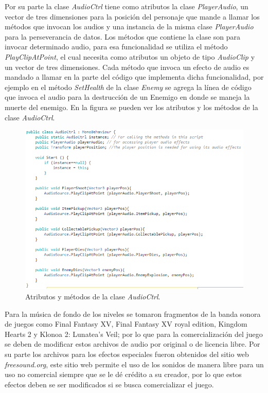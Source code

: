 Por su parte la clase \textit{AudioCtrl} tiene como atributos la clase
\textit{PlayerAudio}, un vector de tres dimensiones para la posición del
personaje que mande a llamar los métodos que invocan los audios y una instancia
de la misma clase \textit{PlayerAudio} para la perseverancia de datos. Los
métodos que contiene la clase son para invocar determinado audio, para esa
funcionalidad se utiliza el método \textit{PlayClipAtPoint}, el cual necesita
como atributos un objeto de tipo \textit{AudioClip} y un vector de tres
dimensiones. Cada método que invoca un efecto de audio es mandado a llamar en la
parte del código que implementa dicha funcionalidad, por ejemplo en el método
\textit{SetHealth} de la clase \textit{Enemy} se agrega la línea de código que
invoca el audio para la destrucción de un Enemigo en donde se maneja la muerte
del enemigo. En la figura se pueden ver los atributos y los métodos de la clase
\textit{AudioCtrl}.  

    \begin{figure}[h]
        \centering
        \includegraphics[height=0.3 \textheight]{03TrabajoRealizado/imagenes/audioCtrl.png}
        \caption{Atributos y métodos de la clase \textit{AudioCtrl}.}
        \label{fig:AudioCrl}
    \end{figure}
Para la música de fondo de los niveles se tomaron fragmentos de la banda sonora
de juegos como Final Fantasy XV, Final Fantasy XV royal edition, Kingdom Hearts 2
y Klonoa 2: Lunatea's Veil; por lo que para la comercialización del juego se deben
de modificar estos archivos de audio por original o de licencia libre. Por su
parte los archivos para los efectos especiales fueron obtenidos del sitio web
\textit{freesound.org}, este sitio web permite el uso de los sonidos de manera
libre para un uso no comercial siempre que se le dé crédito a su creador, por lo
que estos efectos deben se ser modificados si se busca comercializar el juego.
